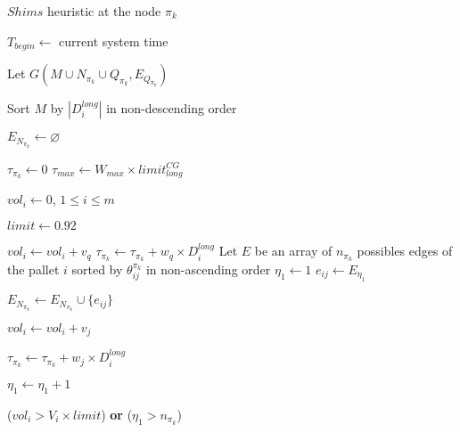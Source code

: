 \documentclass[preprint]{elsarticle}
\begin{document}
\begin{algorithm}[H]
	\caption{$Shims$\/ heuristic at the node $\pi_k$}  \label{alg:shims}
	\begin{algorithmic}[1]
		
	
		\State $T_{begin} \gets$ current system time
	
		\State Let $G(M \cup N_{\pi_k} \cup Q_{\pi_k}, E_{Q_{\pi_k}})$   \label{shims:initQ}
		
		\State Sort $M$ by $|D_i^{long}|$ in non-descending order \label{shims:pallets}
		
		\State $E_{N_{\pi_k}} \gets \varnothing$  
				
		\State $\tau_{\pi_k} \gets 0$	 	
		\State $\tau_{max} \gets W_{max} \times limit^{CG}_{long}$ 
			
		\State $vol_i \gets 0$, $1\leq i \leq m$
			
		\State $limit \gets 0.92$  \label{shims:limit}
		
		  \label{shims:eta1_a}
							
			
					\State $vol_i \gets vol_i + v_q$ 
					\State $\tau_{\pi_k} \gets \tau_{\pi_k} + w_q \times D_i^{long}$
				\EndIf	
			\EndFor	
			\State Let $E$\/ be an array of $n_{\pi_k}$ possibles edges of the pallet $i$\/ sorted by $\theta_{ij}^{\pi_k}$ in non-ascending order \label{shims:possible}
			\State $\eta_1 \gets 1$  
			\Repeat
				\State $e_{ij} \gets E_{\eta_1}$ 
								
				
					\State $E_{N_{\pi_k}} \gets E_{N_{\pi_k}} \cup \{e_{ij}\}$
					
					\State $vol_i \gets vol_i + v_j$
					
					\State $\tau_{\pi_k} \gets \tau_{\pi_k} + w_j \times D_i^{long}$
					
					\State $\eta_1 \gets \eta_1 + 1$ 
				
				\EndIf
			\Until ($vol_i > V_i \times limit$) {\bf or} ($\eta_1>n_{\pi_k}$)		  \label{shims:endfirst}	
				


\end{algorithmic}
\end{algorithm}
\end{document}
